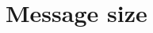 \documentclass[../report.tex]{subfiles}
\begin{document}
\section{Message size}

% 
% 
% 
% 
% 
% 
% 
% 
% 
% 
% 
% 
\end{document}
